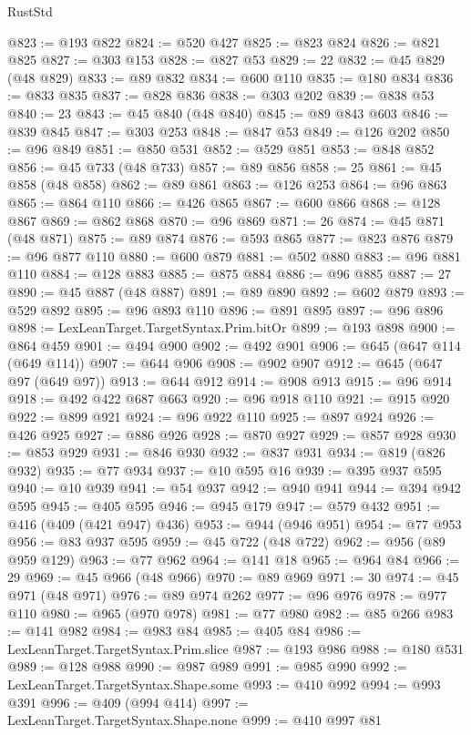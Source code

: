 \begin{lexlean}{RustStd}
\begin{coremodule}
{\begin{coremodule}
{{{{{{{{{{{{{{{{{{{{{{{{{{{{{{{{{{{{{{{{{{{{{{{{{{{{{{{{{{{{@823 := @193 @822
@824 := @520 @427
@825 := @823 @824
@826 := @821 @825
@827 := @303 @153
@828 := @827 @53
@829 := 22
@832 := @45 @829 (@48 @829)
@833 := @89 @832
@834 := @600 @110
@835 := @180 @834
@836 := @833 @835
@837 := @828 @836
@838 := @303 @202
@839 := @838 @53
@840 := 23
@843 := @45 @840 (@48 @840)
@845 := @89 @843 @603
@846 := @839 @845
@847 := @303 @253
@848 := @847 @53
@849 := @126 @202
@850 := @96 @849
@851 := @850 @531
@852 := @529 @851
@853 := @848 @852
@856 := @45 @733 (@48 @733)
@857 := @89 @856
@858 := 25
@861 := @45 @858 (@48 @858)
@862 := @89 @861
@863 := @126 @253
@864 := @96 @863
@865 := @864 @110
@866 := @426 @865
@867 := @600 @866
@868 := @128 @867
@869 := @862 @868
@870 := @96 @869
@871 := 26
@874 := @45 @871 (@48 @871)
@875 := @89 @874
@876 := @593 @865
@877 := @823 @876
@879 := @96 @877 @110
@880 := @600 @879
@881 := @502 @880
@883 := @96 @881 @110
@884 := @128 @883
@885 := @875 @884
@886 := @96 @885
@887 := 27
@890 := @45 @887 (@48 @887)
@891 := @89 @890
@892 := @602 @879
@893 := @529 @892
@895 := @96 @893 @110
@896 := @891 @895
@897 := @96 @896
@898 := LexLeanTarget.TargetSyntax.Prim.bitOr
@899 := @193 @898
@900 := @864 @459
@901 := @494 @900
@902 := @492 @901
@906 := @645 (@647 @114 (@649 @114))
@907 := @644 @906
@908 := @902 @907
@912 := @645 (@647 @97 (@649 @97))
@913 := @644 @912
@914 := @908 @913
@915 := @96 @914
@918 := @492 @422 @687 @663
@920 := @96 @918 @110
@921 := @915 @920
@922 := @899 @921
@924 := @96 @922 @110
@925 := @897 @924
@926 := @426 @925
@927 := @886 @926
@928 := @870 @927
@929 := @857 @928
@930 := @853 @929
@931 := @846 @930
@932 := @837 @931
@934 := @819 (@826 @932)
@935 := @77 @934
@937 := @10 @595 @16
@939 := @395 @937 @595
@940 := @10 @939
@941 := @54 @937
@942 := @940 @941
@944 := @394 @942 @595
@945 := @405 @595
@946 := @945 @179
@947 := @579 @432
@951 := @416 (@409 (@421 @947) @436)
@953 := @944 (@946 @951)
@954 := @77 @953
@956 := @83 @937 @595
@959 := @45 @722 (@48 @722)
@962 := @956 (@89 @959 @129)
@963 := @77 @962
@964 := @141 @18
@965 := @964 @84
@966 := 29
@969 := @45 @966 (@48 @966)
@970 := @89 @969
@971 := 30
@974 := @45 @971 (@48 @971)
@976 := @89 @974 @262
@977 := @96 @976
@978 := @977 @110
@980 := @965 (@970 @978)
@981 := @77 @980
@982 := @85 @266
@983 := @141 @982
@984 := @983 @84
@985 := @405 @84
@986 := LexLeanTarget.TargetSyntax.Prim.slice
@987 := @193 @986
@988 := @180 @531
@989 := @128 @988
@990 := @987 @989
@991 := @985 @990
@992 := LexLeanTarget.TargetSyntax.Shape.some
@993 := @410 @992
@994 := @993 @391
@996 := @409 (@994 @414)
@997 := LexLeanTarget.TargetSyntax.Shape.none
@999 := @410 @997 @81
}}}}}}}}}}}}}}}}}}}}}}}}}}}}}}}}}}}}}}}}}}}}}}}}}}}}}}}}}}}}
\end{coremodule}}
\end{coremodule}
\end{lexlean}
